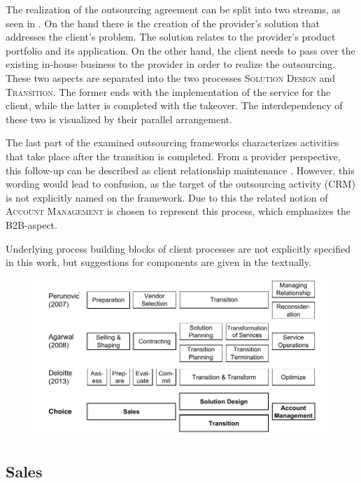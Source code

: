 	The realization of the outsourcing agreement can be split into two streams, as seen in \citep{Agarwal_2008}. On the hand there is the creation of the provider's solution that addresses the client's problem. The solution relates to the provider's product portfolio and its application.  On the other hand, the client needs to pass over the existing in-house business to the provider in order to realize the outsourcing. These two aspects are separated into the two processes \textsc{Solution Design} and \textsc{Transition}. The former ends with the implementation of the service for the client, while the latter is completed with the takeover. The interdependency of these two is visualized by their parallel arrangement. 
	
	The last part of the examined outsourcing frameworks characterizes activities that take place after the transition is completed. From a provider perspective, this follow-up can be described as client relationship maintenance \citep{Moncrief_2005}. However, this wording would lead to confusion, as the target of the outsourcing activity (\viz \acrshort{CRM}) is not explicitly named on the framework. Due to this the related notion of \textsc{Account Management} is chosen to represent this process, which emphasizes the B2B-aspect. 
	
	Underlying process building blocks of client processes are not explicitly specified in this work, but suggestions for components are given in the textually. 
	
	\begin{figure}[caption={Outsourcing Process Framework Comparison}, label={fig:outsourcingprocesses}]
		{	\includegraphics[width=.95\textwidth]{figures/outsourcingprocs.pdf}}
	\end{figure} 
	
	
	\subsection{Sales}
	
